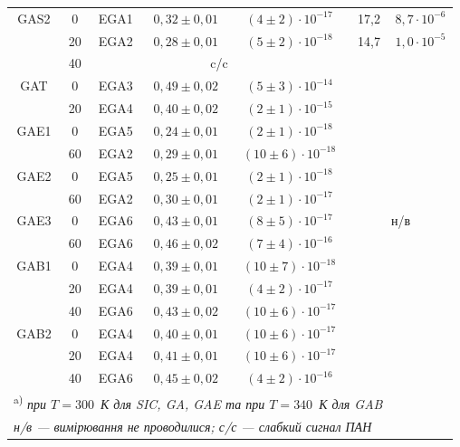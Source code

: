\begin{table}
\begin{tabular}{|c|c|c|c|c|c|c|}
GAS2& 0 &EGA1& $0,32\pm0,01$ &$(4\pm2)\cdot10^{-17}$&17,2&$8,7\cdot10^{-6}$\\ \cline{2-7}
& 20 &EGA2& $0,28\pm0,01$ &$(5\pm2)\cdot10^{-18}$&14,7&$1,0\cdot10^{-5}$\\ \cline{2-7}
& 40 & \multicolumn{3}{c|}{c/c}&\multicolumn{2}{c|}{}\\ \cline{1-5}
GAT& 0 &EGA3& $0,49\pm0,02$ &$(5\pm3)\cdot10^{-14}$&\multicolumn{2}{c|}{}\\ \cline{2-5}
& 20 &EGA4& $0,40\pm0,02$ &$(2\pm1)\cdot10^{-15}$&\multicolumn{2}{c|}{}\\ \cline{1-5}
GAE1& 0 &EGA5& $0,24\pm0,01$ &$(2\pm1)\cdot10^{-18}$&\multicolumn{2}{c|}{}\\ \cline{2-5}
& 60 &EGA2& $0,29\pm0,01$ &$(10\pm6)\cdot10^{-18}$&\multicolumn{2}{c|}{}\\ \cline{1-5}
GAE2& 0 &EGA5& $0,25\pm0,01$ &$(2\pm1)\cdot10^{-18}$&\multicolumn{2}{c|}{}\\ \cline{2-5}
& 60 &EGA2& $0,30\pm0,01$ &$(2\pm1)\cdot10^{-17}$&\multicolumn{2}{c|}{}\\ \cline{1-5}
GAE3& 0 &EGA6& $0,43\pm0,01$ &$(8\pm5)\cdot10^{-17}$&\multicolumn{2}{c|}{н/в}\\ \cline{2-5}
& 60 &EGA6& $0,46\pm0,02$ &$(7\pm4)\cdot10^{-16}$&\multicolumn{2}{c|}{}\\ \cline{1-5}
GAB1& 0 &EGA4& $0,39\pm0,01$ &$(10\pm7)\cdot10^{-18}$&\multicolumn{2}{c|}{}\\ \cline{2-5}
& 20 &EGA4& $0,39\pm0,01$ &$(4\pm2)\cdot10^{-17}$&\multicolumn{2}{c|}{}\\ \cline{2-5}
& 40 &EGA6& $0,43\pm0,02$ &$(10\pm6)\cdot10^{-17}$&\multicolumn{2}{c|}{}\\ \cline{1-5}
GAB2& 0 &EGA4& $0,40\pm0,01$ &$(10\pm6)\cdot10^{-17}$&\multicolumn{2}{c|}{}\\ \cline{2-5}
& 20 &EGA4& $0,41\pm0,01$ &$(10\pm6)\cdot10^{-17}$&\multicolumn{2}{c|}{}\\ \cline{2-5}
& 40 &EGA6& $0,45\pm0,02$ &$(4\pm2)\cdot10^{-16}$&\multicolumn{2}{c|}{}\\  \hline
\multicolumn{6}{l}{\textsuperscript{ a)} \emph{при $T=300$~К для SIC, GA, GAE та при  $T=340$~К для GAB}}\\
\multicolumn{6}{l}{\emph{н/в --- вимірювання не проводилися; с/с --- слабкий сигнал ПАН}}\\
\end{tabular}
\end{table}

